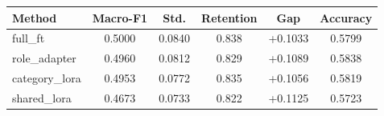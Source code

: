 \begin{tabular}{lccccc}
\toprule
Method & Macro-F1 & Std. & Retention & Gap & Accuracy \\
\midrule
full\_ft & 0.5000 & 0.0840 & 0.838 & +0.1033 & 0.5799 \\
role\_adapter & 0.4960 & 0.0812 & 0.829 & +0.1089 & 0.5838 \\
category\_lora & 0.4953 & 0.0772 & 0.835 & +0.1056 & 0.5819 \\
shared\_lora & 0.4673 & 0.0733 & 0.822 & +0.1125 & 0.5723 \\
\bottomrule
\end{tabular}
